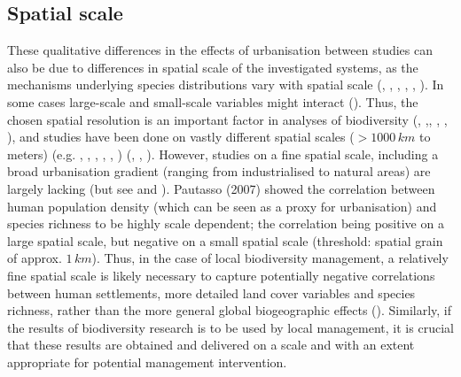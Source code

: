 \documentclass{article}
\begin{document}
\subsection{Spatial scale}
These qualitative differences in the effects of urbanisation between studies can also be due to differences in spatial scale of the investigated systems, as the mechanisms underlying species distributions vary with spatial scale (\cite{Borgstrom2006}, \cite{Clergeau2006}, \cite{Pautasso2007}, \cite{Ahrne2009}, \cite{Gerstner2014}, \cite{Concepcion2015}). In some cases large-scale and small-scale variables might interact (\cite{Polce2011}). 
Thus, the chosen spatial resolution is an important factor in analyses of biodiversity (\cite{Deutschewitz2003}, \cite{Gaston2005},\cite{Kuhn2006}, \cite{McKinney2006}, \cite{Ahrne2009}, \cite{Concepcion2016}), and studies have been done on vastly different spatial scales ($>1000\,km$ to meters) (e.g. \cite{Kuhn2006}, \cite{Polce2011},  \cite{Aronson2014}, \cite{Blair1996},  \cite{Gaston2005}, \cite{Ahrne2009}) (\cite{Gaston2000}, \cite{Clergeau2006}, \cite{Pautasso2007}).
However, studies on a fine spatial scale, including a broad urbanisation gradient (ranging from industrialised to natural areas) are largely lacking (but see \cite{Turrini2015a} and \cite{Concepcion2016}).
Pautasso (2007) showed the correlation between human population density (which can be seen as a proxy for urbanisation) and species richness to be highly scale dependent; the correlation being positive on a large spatial scale, but negative on a small spatial scale (threshold: spatial grain of approx. $1\,km$).
Thus, in the case of local biodiversity management, a relatively fine spatial scale is likely necessary to capture potentially negative correlations between human settlements, more detailed land cover variables and species richness, rather than the more general global biogeographic effects (\cite{Gaston2005}).  
Similarly, if the results of biodiversity research is to be used by local management, it is crucial that these results are obtained and delivered on a scale and with an extent appropriate for potential management intervention.\\

\end{document}
